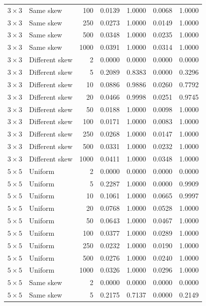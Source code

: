 \begin{longtable}{@{}llrrrrr@{}}
\(3\times3\) & Same skew & 100 & 0.0139 & 1.0000 & 0.0068 & 1.0000 \\
\(3\times3\) & Same skew & 250 & 0.0273 & 1.0000 & 0.0149 & 1.0000 \\
\(3\times3\) & Same skew & 500 & 0.0348 & 1.0000 & 0.0235 & 1.0000 \\
\(3\times3\) & Same skew & 1000 & 0.0391 & 1.0000 & 0.0314 & 1.0000 \\
\addlinespace
\(3\times3\) & Different skew & 2 & 0.0000 & 0.0000 & 0.0000 & 0.0000 \\
\(3\times3\) & Different skew & 5 & 0.2089 & 0.8383 & 0.0000 & 0.3296 \\
\(3\times3\) & Different skew & 10 & 0.0886 & 0.9886 & 0.0260 & 0.7792 \\
\(3\times3\) & Different skew & 20 & 0.0466 & 0.9998 & 0.0251 & 0.9745 \\
\(3\times3\) & Different skew & 50 & 0.0188 & 1.0000 & 0.0098 & 1.0000 \\
\(3\times3\) & Different skew & 100 & 0.0171 & 1.0000 & 0.0083 & 1.0000 \\
\(3\times3\) & Different skew & 250 & 0.0268 & 1.0000 & 0.0147 & 1.0000 \\
\(3\times3\) & Different skew & 500 & 0.0331 & 1.0000 & 0.0232 & 1.0000 \\
\(3\times3\) & Different skew & 1000 & 0.0411 & 1.0000 & 0.0348 & 1.0000 \\
\addlinespace
\(5\times5\) & Uniform & 2 & 0.0000 & 0.0000 & 0.0000 & 0.0000 \\
\(5\times5\) & Uniform & 5 & 0.2287 & 1.0000 & 0.0000 & 0.9909 \\
\(5\times5\) & Uniform & 10 & 0.1061 & 1.0000 & 0.0665 & 0.9997 \\
\(5\times5\) & Uniform & 20 & 0.0768 & 1.0000 & 0.0528 & 1.0000 \\
\(5\times5\) & Uniform & 50 & 0.0643 & 1.0000 & 0.0467 & 1.0000 \\
\(5\times5\) & Uniform & 100 & 0.0377 & 1.0000 & 0.0289 & 1.0000 \\
\(5\times5\) & Uniform & 250 & 0.0232 & 1.0000 & 0.0190 & 1.0000 \\
\(5\times5\) & Uniform & 500 & 0.0276 & 1.0000 & 0.0240 & 1.0000 \\
\(5\times5\) & Uniform & 1000 & 0.0326 & 1.0000 & 0.0296 & 1.0000 \\
\addlinespace
\(5\times5\) & Same skew & 2 & 0.0000 & 0.0000 & 0.0000 & 0.0000 \\
\(5\times5\) & Same skew & 5 & 0.2175 & 0.7137 & 0.0000 & 0.2149 \\

\end{longtable}
